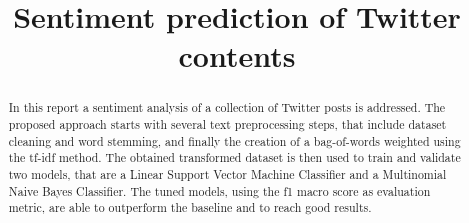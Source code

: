 \documentclass[conference]{IEEEtran}
\begin{document}
\title{Sentiment prediction of Twitter contents}

\author{
}

\maketitle

\begin{abstract}
In this report a sentiment analysis of a collection of Twitter posts is addressed. The proposed approach starts with several text preprocessing steps, that include dataset cleaning and word stemming, and finally the creation of a bag-of-words weighted using the tf-idf method. The obtained transformed dataset is then used to train and validate two models, that are a Linear Support Vector Machine Classifier and a Multinomial Naive Bayes Classifier. The tuned models, using the f1 macro score as evaluation metric, are able to outperform the baseline and to reach good results. 
\end{abstract}
\end{document}
